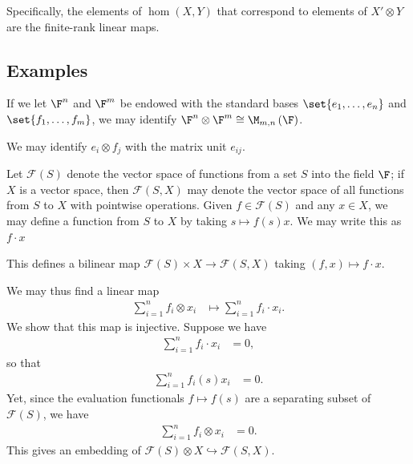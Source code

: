 \documentclass[10pt]{mypackage}
\begin{document}
Specifically, the elements of $\hom\left( X,Y \right)$ that correspond to elements of $X'\otimes Y$ are the finite-rank linear maps. 
\subsection{Examples}%
\begin{example}[Matrices]
  If we let $\F^{n}$ and $\F^{m}$ be endowed with the standard bases $\set{e_1,\dots,e_n}$ and $\set{f_1,\dots,f_m}$, we may identify $\F^{n}\otimes \F^{m}\cong \M_{m,n}\left( \F \right)$.

  We may identify $e_i\otimes f_j$ with the matrix unit $e_{ij}$.
\end{example}
\begin{example}
  Let $\mathcal{F}(S)$ denote the vector space of functions from a set $S$ into the field $\F$; if $X$ is a vector space, then $\mathcal{F}\left( S,X \right)$ may denote the vector space of all functions from $S$ to $X$ with pointwise operations. Given $f\in \mathcal{F}(S)$ and any $x\in X$, we may define a function from $S$ to $X$ by taking $s\mapsto f(s)x$. We may write this as $f\cdot x$

  This defines a bilinear map $\mathcal{F}(S)\times X\rightarrow \mathcal{F}\left( S,X \right)$ taking $\left( f,x \right)\mapsto f\cdot x$.

  We may thus find a linear map
  \begin{align*}
    \sum_{i=1}^{n} f_i\otimes x_i &\mapsto \sum_{i=1}^{n}f_i\cdot x_i.
  \end{align*}
  We show that this map is injective. Suppose we have
  \begin{align*}
    \sum_{i=1}^{n}f_i\cdot x_i &= 0,
  \end{align*}
  so that
  \begin{align*}
    \sum_{i=1}^{n}f_i(s)x_i &= 0.
  \end{align*}
  Yet, since the evaluation functionals $f\mapsto f(s)$ are a separating subset of $\mathcal{F}(S)$, we have
  \begin{align*}
    \sum_{i=1}^{n}f_i\otimes x_i &= 0.
  \end{align*}
  This gives an embedding of $\mathcal{F}(S)\otimes X\hookrightarrow \mathcal{F}(S,X)$.
\end{example}
\end{document}
